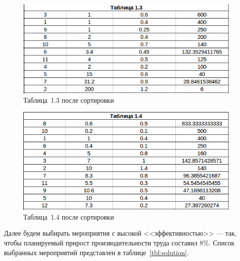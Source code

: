 \begin{figure}[htbp]
  \centering
  \includegraphics[width=0.8\linewidth]{img/tabl13}
  \caption{Таблица~1.3 после сортировки}\label{fig:tabl13}
\end{figure}

\begin{figure}[htbp]
  \centering
  \includegraphics[width=0.8\linewidth]{img/tabl14}
  \caption{Таблица~1.4 после сортировки}\label{fig:tabl14}
\end{figure}

\newpage

Далее будем выбирать мероприятия с высокой <<эффективностью>> --- так, чтобы планируемый
прирост производительности труда составил 8\%. Список выбранных мероприятий
представлен в таблице~\ref{tbl:solution}.

